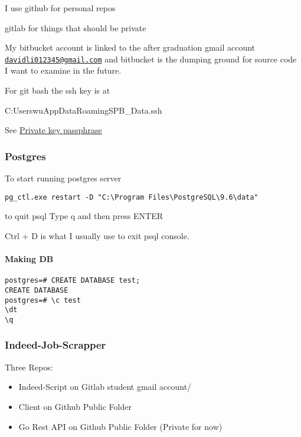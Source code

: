 I use github for personal repos

gitlab for things that should be private

My bitbucket account is linked to the after graduation gmail account
\href{mailto:davidli012345@gmail.com}{\nolinkurl{davidli012345@gmail.com}}
and bitbucket is the dumping ground for source code I want to examine in
the future.

For git bash the ssh key is at

C:UserswuAppDataRoamingSPB\_Data.ssh

See
\href{https://serverfault.com/questions/50775/how-do-i-change-my-private-key-passphrase}{Private key passphrase}


\subsubsection{Postgres}\label{postgres}

To start running postgres server

\begin{verbatim}
pg_ctl.exe restart -D "C:\Program Files\PostgreSQL\9.6\data"
\end{verbatim}

to quit psql Type q and then press ENTER

Ctrl + D is what I usually use to exit psql console.


\paragraph{Making DB}\label{making-db}

\begin{verbatim}
postgres=# CREATE DATABASE test;
CREATE DATABASE
postgres=# \c test 
\dt 
\q
\end{verbatim}


\subsubsection{Indeed-Job-Scrapper}\label{indeed-job-scrapper}

Three Repos:

\begin{itemize}

\item
  Indeed-Script on Gitlab student gmail account/
\item
  Client on Github Public Folder
\item
  Go Rest API on Github Public Folder (Private for now)
\end{itemize}


